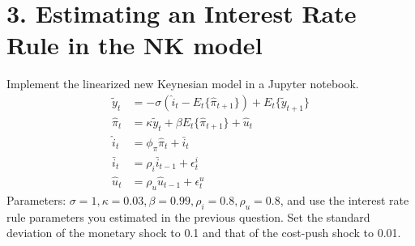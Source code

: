 \documentclass{article}
\newcommand{\1}{\mathbf{1}}
\begin{document}
\section*{3. Estimating an Interest Rate Rule in the NK model}
Implement the linearized new Keynesian model in a Jupyter notebook. 
\begin{align*}
	\tilde{y}_t &=-\sigma\left(\hat{i}_t-E_t\{\hat{\pi}_{t+1}\}\right)+E_t\{\tilde{y}_{t+1}\} \\
	\hat{\pi}_t&=\kappa \tilde{y}_{t} +\beta E_t \{\hat{\pi}_{t+1}\} + \hat{u}_t \\
	\hat{i}_t&= \phi_\pi\hat{\pi}_t + \bar{i}_t \\
	\bar{i}_t&=\rho_i \bar{i}_{t-1}+\epsilon^i_t \\
	\hat{u}_{t}&=\rho_u \hat{u}_{t-1}+\epsilon^u_t 
\end{align*}
Parameters: $\sigma=1,\kappa=0.03,\beta=0.99, \rho_i = 0.8,\rho_u=0.8$, and use the interest rate rule parameters you estimated in the previous question. Set the standard deviation of the monetary shock to 0.1 and that of the cost-push shock to 0.01.
\end{document}
